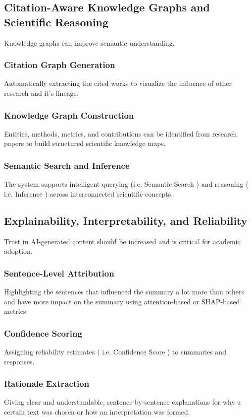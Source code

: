 \documentclass[conference]{IEEEtran}
\begin{document}
\subsection{Citation-Aware Knowledge Graphs and Scientific Reasoning}
Knowledge graphs can improve semantic understanding.

\subsubsection{Citation Graph Generation}
Automatically extracting the cited works to visualize the influence of other research and it's lineage.

\subsubsection{Knowledge Graph Construction}
Entities, methods, metrics, and contributions can be identified from research papers to build structured scientific knowledge maps.

\subsubsection{Semantic Search and Inference}
The system supports intelligent querying (i.e. Semantic Search ) and reasoning ( i.e. Inference ) across interconnected scientific concepts.

\subsection{Explainability, Interpretability, and Reliability}
Trust in AI-generated content should be increased and is critical for academic adoption.

\subsubsection{Sentence-Level Attribution}
Highlighting the sentences that influenced the summary a lot more than others and have more impact on the summary using attention-based or SHAP-based metrics.

\subsubsection{Confidence Scoring}
Assigning reliability estimates ( i.e. Confidence Score ) to summaries and responses.

\subsubsection{Rationale Extraction}
Giving clear and understandable, sentence-by-sentence explanations for why a certain text was chosen or how an interpretation was formed.
\end{document}
